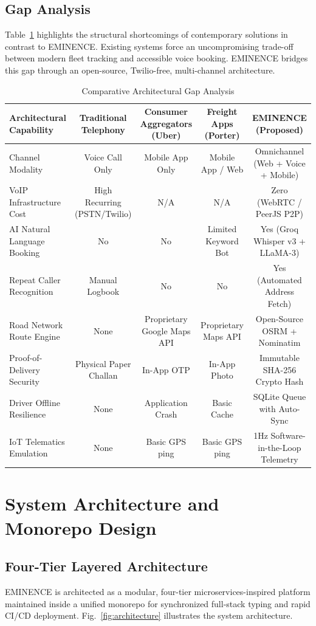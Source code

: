 \documentclass[conference]{IEEEtran}
\begin{document}
\subsection{Gap Analysis}
Table~\ref{tab:gap_analysis} highlights the structural shortcomings of contemporary solutions in contrast to EMINENCE. Existing systems force an uncompromising trade-off between modern fleet tracking and accessible voice booking. EMINENCE bridges this gap through an open-source, Twilio-free, multi-channel architecture.

\begin{table}[t]
\centering
\caption{Comparative Architectural Gap Analysis}
\label{tab:gap_analysis}
\begin{tabular}{lcccc}
\toprule
\textbf{Architectural Capability} & \textbf{Traditional Telephony} & \textbf{Consumer Aggregators (Uber)} & \textbf{Freight Apps (Porter)} & \textbf{EMINENCE (Proposed)} \\
\midrule
Channel Modality & Voice Call Only & Mobile App Only & Mobile App / Web & Omnichannel (Web + Voice + Mobile) \\
VoIP Infrastructure Cost & High Recurring (PSTN/Twilio) & N/A & N/A & Zero (WebRTC / PeerJS P2P) \\
AI Natural Language Booking & No & No & Limited Keyword Bot & Yes (Groq Whisper v3 + LLaMA-3) \\
Repeat Caller Recognition & Manual Logbook & No & No & Yes (Automated Address Fetch) \\
Road Network Route Engine & None & Proprietary Google Maps API & Proprietary Maps API & Open-Source OSRM + Nominatim \\
Proof-of-Delivery Security & Physical Paper Challan & In-App OTP & In-App Photo & Immutable SHA-256 Crypto Hash \\
Driver Offline Resilience & None & Application Crash & Basic Cache & SQLite Queue with Auto-Sync \\
IoT Telematics Emulation & None & Basic GPS ping & Basic GPS ping & 1Hz Software-in-the-Loop Telemetry \\
\bottomrule
\end{tabular}
\end{table}

\section{System Architecture and Monorepo Design}
\subsection{Four-Tier Layered Architecture}
EMINENCE is architected as a modular, four-tier microservices-inspired platform maintained inside a unified monorepo for synchronized full-stack typing and rapid CI/CD deployment. Fig.~\ref{fig:architecture} illustrates the system architecture.
\end{document}
